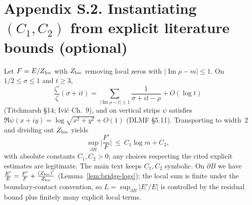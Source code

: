 \documentclass[11pt]{article}
\numberwithin{equation}{section}
\theoremstyle{remark}
\DeclareMathOperator{\Imag}{Im}
\begin{document}
\section*{Appendix S.2. Instantiating $(C_1,C_2)$ from explicit literature bounds (optional)}
Let $F=E/Z_{\rm loc}$ with $Z_{\rm loc}$ removing local zeros with $|\Imag\rho-m|\le 1$. On $1/2\le\sigma\le 1$ and $t\ge 3$,
\[
\frac{\zeta'}{\zeta}(\sigma+it)=\sum_{|\Imag\rho-t|\le 1}\frac{1}{\sigma+it-\rho}+O(\log t)
\]
(Titchmarsh §14; Ivi\'c Ch.~9), and on vertical strips $\psi$ satisfies $\Re\psi(x+iy)=\log\sqrt{x^2+y^2}+O(1)$ (DLMF §5.11). Transporting to width~2 and dividing out $Z_{\rm loc}$ yields
\[
\sup_{\partial B}\Big|\frac{F'}{F}\Big|\ \le\ C_1\log m + C_2,
\]
with absolute constants $C_1,C_2>0$; any choices respecting the cited explicit estimates are legitimate. The main text keeps $C_1,C_2$ symbolic.
On $\partial B$ we have $\frac{E'}{E}=\frac{F'}{F}+\frac{(Z_{\rm loc})'}{Z_{\rm loc}}$ (Lemma~\ref{lem:bridge-logs}); the local sum is finite under the boundary‑contact convention, so $L=\sup_{\partial B}|E'/E|$ is controlled by the residual bound plus finitely many explicit local terms.

\end{document}
